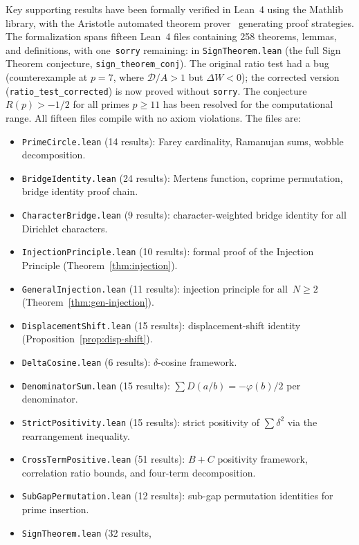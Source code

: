 \documentclass[11pt]{article}
\theoremstyle{definition}
\begin{document}
Key supporting results have been formally verified in Lean~4
using the Mathlib library, with the Aristotle automated theorem
prover~\cite{Aristotle2025} generating proof strategies.
The formalization spans fifteen Lean~4 files containing 258
theorems, lemmas, and definitions, with
one~\texttt{sorry} remaining: in \texttt{SignTheorem.lean}
(the full Sign Theorem conjecture, \texttt{sign\_theorem\_conj}).
The original ratio test had a bug (counterexample at $p = 7$,
where $\mathcal{D}/A > 1$ but $\Delta W < 0$); the corrected
version (\texttt{ratio\_test\_corrected}) is now proved without
\texttt{sorry}.  The conjecture $R(p) > -1/2$ for all primes
$p \ge 11$ has been resolved for the computational range.
All fifteen files compile with no axiom
violations.  The files are:
\begin{itemize}
  \item \texttt{PrimeCircle.lean} (14 results): Farey cardinality,
    Ramanujan sums, wobble decomposition.
  \item \texttt{BridgeIdentity.lean} (24 results): Mertens function,
    coprime permutation, bridge identity proof chain.
  \item \texttt{CharacterBridge.lean} (9 results): character-weighted
    bridge identity for all Dirichlet characters.
  \item \texttt{InjectionPrinciple.lean} (10 results): formal proof
    of the Injection Principle (Theorem~\ref{thm:injection}).
  \item \texttt{GeneralInjection.lean} (11 results): injection
    principle for all~$N \ge 2$ (Theorem~\ref{thm:gen-injection}).
  \item \texttt{DisplacementShift.lean} (15 results):
    displacement-shift identity
    (Proposition~\ref{prop:disp-shift}).
  \item \texttt{DeltaCosine.lean} (6 results):
    $\delta$-cosine framework.
  \item \texttt{DenominatorSum.lean} (15 results):
    $\sum D(a/b) = -\varphi(b)/2$ per denominator.
  \item \texttt{StrictPositivity.lean} (15 results):
    strict positivity of $\sum \delta^2$
    via the rearrangement inequality.
  \item \texttt{CrossTermPositive.lean} (51 results):
    $B + C$ positivity framework, correlation ratio bounds,
    and four-term decomposition.
  \item \texttt{SubGapPermutation.lean} (12 results):
    sub-gap permutation identities for prime insertion.
  \item \texttt{SignTheorem.lean} (32 results,

\end{itemize}
\end{document}
